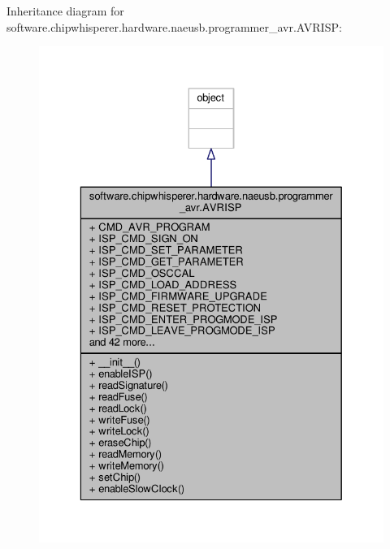 Inheritance diagram for software.\+chipwhisperer.\+hardware.\+naeusb.\+programmer\+\_\+avr.\+A\+V\+R\+I\+S\+P\+:\nopagebreak
\begin{figure}[H]
\begin{center}
\leavevmode
\includegraphics[width=329pt]{d0/d9e/classsoftware_1_1chipwhisperer_1_1hardware_1_1naeusb_1_1programmer__avr_1_1AVRISP__inherit__graph}
\end{center}
\end{figure}


